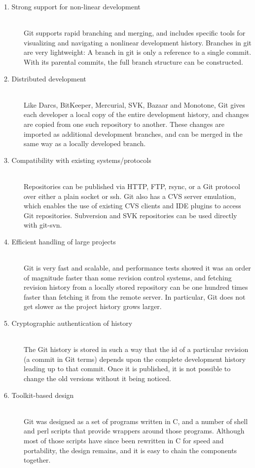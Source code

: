 \begin{description}

\item[1. Strong support for non-linear development] \hfill \\
  Git supports rapid branching and merging, and includes specific tools for
  visualizing and navigating a nonlinear development history. Branches in git
  are very lightweight: A branch in git is only a reference to a single commit.
  With its parental commits, the full branch structure can be constructed.

\item[2. Distributed development] \hfill \\
  Like Darcs, BitKeeper, Mercurial, SVK, Bazaar and Monotone, Git
  gives each developer a local copy of the entire development history,
  and changes are copied from one such repository to another. These
  changes are imported as additional development branches, and can be
  merged in the same way as a locally developed branch.

\item[3. Compatibility with existing systems/protocols] \hfill \\
  Repositories can be published via HTTP, FTP, rsync, or a Git
  protocol over either a plain socket or ssh. Git also has a CVS
  server emulation, which enables the use of existing CVS clients and
  IDE plugins to access Git repositories. Subversion and SVK
  repositories can be used directly with git-svn.

\item[4. Efficient handling of large projects] \hfill \\
  Git is very fast and scalable, and performance tests showed it was
  an order of magnitude faster than some revision control systems, and
  fetching revision history from a locally stored repository can be
  one hundred times faster than fetching it from the remote server. In
  particular, Git does not get slower as the project history grows
  larger.

\item[5. Cryptographic authentication of history] \hfill \\
  The Git history is stored in such a way that the id of a particular
  revision (a commit in Git terms) depends upon the complete
  development history leading up to that commit. Once it is published,
  it is not possible to change the old versions without it being
  noticed.

\item[6. Toolkit-based design] \hfill \\
  Git was designed as a set of programs written in C, and a number of
  shell and perl scripts that provide wrappers around those programs.
  Although most of those scripts have since been rewritten in C for
  speed and portability, the design remains, and it is easy to chain
  the components together.


\end{description}
